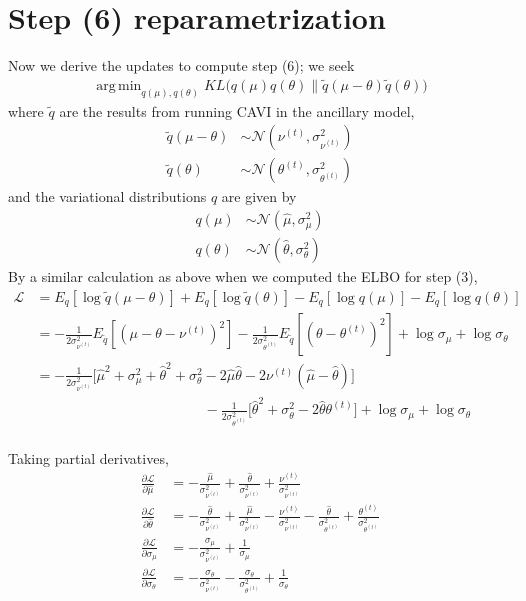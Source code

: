 \documentclass[10pt]{article}
\theoremstyle{plain}
\theoremstyle{definition}
\newcommand{\<}{\langle}
\renewcommand{\>}{\rangle}
\DeclareMathOperator*{\argmin}{arg\,min}
\begin{document}
\section{Step (6) reparametrization}
Now we derive the updates to compute step (6); we seek
\begin{align}
\argmin_{ q(\mu),  q(\theta)} KL\Big( q(\mu)  q(\theta) \| \tilde q(\mu-\theta) \tilde q(\theta)\Big)
\end{align}
where $\tilde q$ are the results from running CAVI in the ancillary model,
\begin{align*}
\tilde q(\mu-\theta) &\sim \mathcal N(\nu^{(t)}, \sigma^2_{\nu^{(t)}})\\
\tilde q(\theta) &\sim \mathcal N(\theta^{(t)}, \sigma^2_{\theta^{(t)}})
\end{align*}
and the variational distributions $q$ are given by
\begin{align}
q(\mu)   &\sim \mathcal N(\hat \mu, \sigma^2_\mu)\\
q(\theta) &\sim \mathcal N(\hat \theta, \sigma^2_{\theta})
\end{align}
By a similar calculation as above when we computed the ELBO for step (3), 
\begin{align}
\mathcal L &= E_{q}[\log \tilde q(\mu-\theta)] + E_{ q}[\log\tilde q(\theta)] - E_{ q}[\log  q(\mu)] - E_{ q}[\log  q(\theta)]\\
	&= -\frac{1}{2\sigma^2_{\nu^{(t)}}} E_{\tilde q}[(\mu-\theta - \nu^{(t)})^2] 
	 - \frac{1}{2\sigma^2_{\theta^{(t)}}} E_{\tilde q}[(\theta - \theta^{(t)})^2]
	 + \log \sigma_\mu + \log\sigma_\theta\\
	 &= -\frac{1}{2\sigma^2_{\nu^{(t)}}} \Big[\hat \mu^2 + \sigma^2_\mu + \hat\theta^2 + \sigma^2_\theta - 2\hat\mu\hat\theta - 2\nu^{(t)}(\hat\mu-\hat\theta)\Big]\\
	 &\quad \quad \quad \quad \quad \quad \quad \quad \quad \quad \quad \quad 
	  - \frac{1}{2\sigma^2_{\theta^{(t)}}} \Big[\hat\theta^2 + \sigma^2_\theta  - 2\hat\theta\theta^{(t)} \Big]
	 + \log \sigma_\mu + \log\sigma_\theta\\
\end{align}

Taking partial derivatives, 
\begin{align}
\frac{\partial \mathcal L}{\partial \hat\mu} &= - \frac{\hat \mu}{\sigma^2_{\nu^{(t)}}} + \frac{\hat \theta}{\sigma^2_{\nu^{(t)}}} +  \frac{\nu^{(t)}}{\sigma^2_{\nu^{(t)}}} \\
\frac{\partial \mathcal L}{\partial \hat\theta} 	&=  - \frac{\hat \theta}{\sigma^2_{\nu^{(t)}}}  + \frac{\hat \mu}{\sigma^2_{\nu^{(t)}}} -  \frac{\nu^{(t)}}{\sigma^2_{\nu^{(t)}}} - \frac{\hat\theta}{\sigma^2_{\theta^{(t)}}} + \frac{\theta^{(t)}}{\sigma^2_{\theta^{(t)}}}\\
\frac{\partial \mathcal L}{\partial \sigma_\mu} &= - \frac{\sigma_\mu}{\sigma^2_{\nu^{(t)}}} + \frac{1}{\sigma_\mu}\\
\frac{\partial \mathcal L}{\partial \sigma_\theta} &= - \frac{\sigma_\theta} {\sigma^2_{\nu^{(t)}}} - \frac{\sigma_\theta}{\sigma_{\theta^{(t)}}^2}+ \frac{1}{\sigma_\theta}
\end{align}
\end{document}
